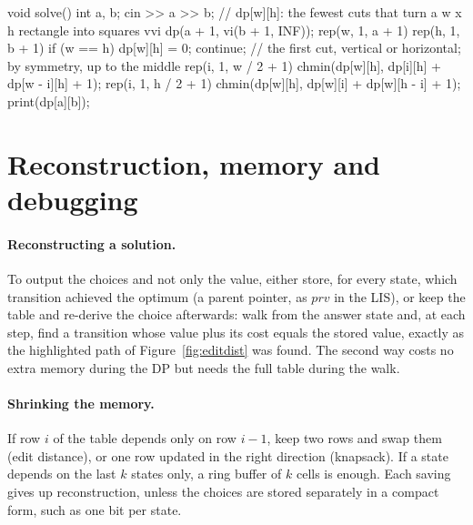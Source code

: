 \begin{code}
void solve() {
    int a, b;
    cin >> a >> b;
    // dp[w][h]: the fewest cuts that turn a w x h rectangle into squares
    vvi dp(a + 1, vi(b + 1, INF));
    rep(w, 1, a + 1) rep(h, 1, b + 1) {
        if (w == h) {
            dp[w][h] = 0;
            continue;
        }
        // the first cut, vertical or horizontal; by symmetry, up to the middle
        rep(i, 1, w / 2 + 1) chmin(dp[w][h], dp[i][h] + dp[w - i][h] + 1);
        rep(i, 1, h / 2 + 1) chmin(dp[w][h], dp[w][i] + dp[w][h - i] + 1);
    }
    print(dp[a][b]);
}
\end{code}

\section[Reconstruction, memory and debugging]{Reconstruction, memory and debugging \hfill \gold}\label{sec:dp-debug}

\paragraph{Reconstructing a solution.} To output the choices and not only the value, either store, for every state, which transition
achieved the optimum (a parent pointer, as $\mathit{prv}$ in the LIS), or keep the table and re-derive the choice afterwards: walk from
the answer state and, at each step, find a transition whose value plus its cost equals the stored value, exactly as the highlighted path
of Figure~\ref{fig:editdist} was found. The second way costs no extra memory during the DP but needs the full table during the walk.

\paragraph{Shrinking the memory.} If row $i$ of the table depends only on row $i - 1$, keep two rows and swap them (edit distance), or
one row updated in the right direction (knapsack). If a state depends on the last $k$ states only, a ring buffer of $k$ cells is
enough. Each saving gives up reconstruction, unless the choices are stored separately in a compact form, such as one bit per state.


